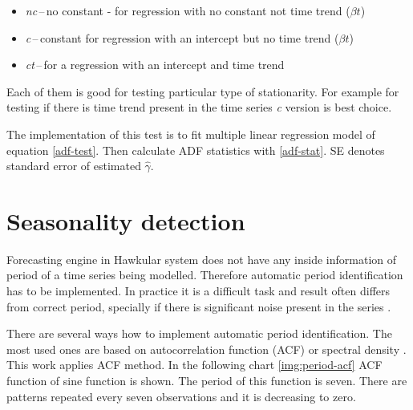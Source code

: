     \begin{itemize}
        \item \emph{nc}\,--\,no constant - for regression with no constant not time trend ($\beta t$)
        \item \emph{c}\,--\,constant for regression with an intercept but no time trend ($\beta t$)
        \item \emph{ct}\,--\,for a regression with an intercept and time trend
    \end{itemize}

    Each of them is good for testing particular type of stationarity. For example for testing if there is time trend
    present in the time series \emph{c} version is best choice.

    The implementation of this test is to fit multiple linear regression model of equation \ref{adf-test}. Then
    calculate ADF statistics with \ref{adf-stat}. SE denotes standard error of estimated $\hat{\gamma}$.

    \section{Seasonality detection}
    Forecasting engine in Hawkular system does not have any inside information of period of a time series being
    modelled. Therefore automatic period identification has to be implemented. In practice it is
    a difficult task and result often differs from correct period, specially if there is significant noise present in
    the series \cite{period-meteo}.

    There are several ways how to implement automatic period identification. The most used ones are based on
    autocorrelation function (ACF) or spectral density \cite{period-hydman}. This work applies ACF method.
    In the following chart \ref{img:period-acf} ACF function of sine function is shown. The period of this
    function is seven. There are patterns repeated every seven observations and it is decreasing to zero.

